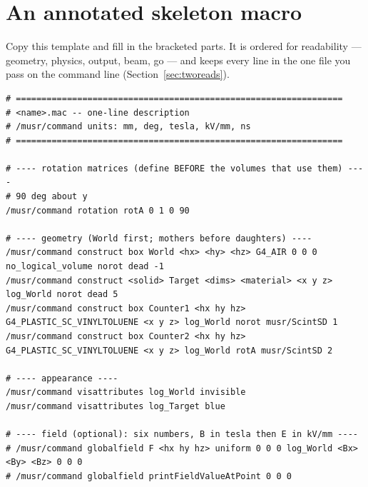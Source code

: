\chapter{An annotated skeleton macro}
\label{app:skeleton}
Copy this template and fill in the bracketed parts. It is ordered for readability --- geometry, physics, output, beam, go --- and keeps every  line in the one file you pass on the command line (Section~\ref{sec:tworeads}).

\begin{lstlisting}[style=mac,caption={A reusable starting point for a new simulation}]
# ================================================================
# <name>.mac -- one-line description
# /musr/command units: mm, deg, tesla, kV/mm, ns
# ================================================================

# ---- rotation matrices (define BEFORE the volumes that use them) ----
# 90 deg about y
/musr/command rotation rotA 0 1 0 90

# ---- geometry (World first; mothers before daughters) ----
/musr/command construct box World <hx> <hy> <hz> G4_AIR 0 0 0 no_logical_volume norot dead -1
/musr/command construct <solid> Target <dims> <material> <x y z> log_World norot dead 5
/musr/command construct box Counter1 <hx hy hz> G4_PLASTIC_SC_VINYLTOLUENE <x y z> log_World norot musr/ScintSD 1
/musr/command construct box Counter2 <hx hy hz> G4_PLASTIC_SC_VINYLTOLUENE <x y z> log_World rotA musr/ScintSD 2

# ---- appearance ----
/musr/command visattributes log_World invisible
/musr/command visattributes log_Target blue

# ---- field (optional): six numbers, B in tesla then E in kV/mm ----
# /musr/command globalfield F <hx hy hz> uniform 0 0 0 log_World <Bx> <By> <Bz> 0 0 0
# /musr/command globalfield printFieldValueAtPoint 0 0 0


\end{lstlisting}
